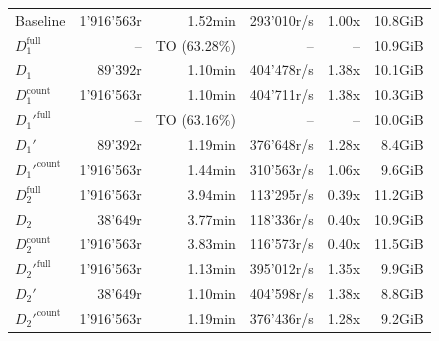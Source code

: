 \begin{longtable}{lrrrrr}
    \nopagebreak
    Baseline              &  1'916'563r           &  1.52min        &  293'010r/s          & 1.00x             & 10.8GiB   \\
    $D_1^{\text{full}}$   &  --                   &  TO (63.28\%)    &  --                  & --                & 10.9GiB   \\
    \quad $D_1$           &  89'392r              &  1.10min        &  404'478r/s          & 1.38x             & 10.1GiB   \\
    $D_1^{\text{count}}$  &  1'916'563r           &  1.10min        &  404'711r/s          & 1.38x             & 10.3GiB   \\
    $D_1'^{\text{full}}$  &  --                   &  TO (63.16\%)   &  --                  & --                & 10.0GiB   \\
    \quad $D_1'$          &  89'392r              &  1.19min        &  376'648r/s          & 1.28x             & 8.4GiB    \\
    $D_1'^{\text{count}}$ &  1'916'563r           &  1.44min        &  310'563r/s          & 1.06x             & 9.6GiB   \\
    $D_2^{\text{full}}$   &  1'916'563r           &  3.94min        &  113'295r/s          & 0.39x             & 11.2GiB   \\
    \quad $D_2$           &  38'649r              &  3.77min        &  118'336r/s          & 0.40x             & 10.9GiB   \\
    $D_2^{\text{count}}$  &  1'916'563r           &  3.83min        &  116'573r/s          & 0.40x             & 11.5GiB   \\
    $D_2'^{\text{full}}$  &  1'916'563r           &  1.13min        &  395'012r/s          & 1.35x             & 9.9GiB   \\
    \quad $D_2'$          &  38'649r              &  1.10min        &  404'598r/s          & 1.38x             & 8.8GiB    \\
    $D_2'^{\text{count}}$ &  1'916'563r           &  1.19min        &  376'436r/s          & 1.28x             & 9.2GiB   \\

    \bottomrule

\end{longtable}





